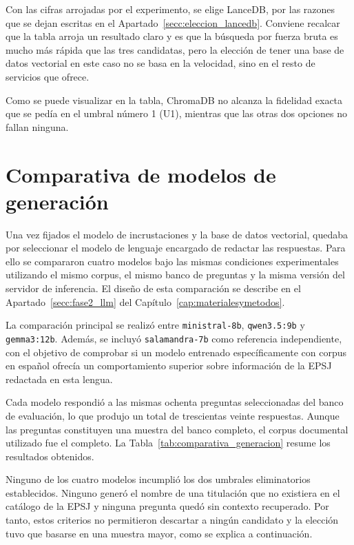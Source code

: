 Con las cifras arrojadas por el experimento, se elige LanceDB, por las razones que se dejan escritas en el Apartado~\ref{secc:eleccion_lancedb}. Conviene recalcar que la tabla arroja un resultado claro y es que la búsqueda por fuerza bruta es mucho más rápida que las tres candidatas, pero la elección de tener una base de datos vectorial en este caso no se basa en la velocidad, sino en el resto de servicios que ofrece.

Como se puede visualizar en la tabla, ChromaDB no alcanza la fidelidad exacta que se pedía en el umbral número 1 (U1), mientras que las otras dos opciones no fallan ninguna.


\section[Comparativa de modelos de generación]{Comparativa de modelos de generación}
\label{secc:resultados_rag}

Una vez fijados el modelo de incrustaciones y la base de datos vectorial, quedaba por seleccionar el modelo de lenguaje encargado de redactar las respuestas. Para ello se compararon cuatro modelos bajo las mismas condiciones experimentales utilizando el mismo corpus, el mismo banco de preguntas y la misma versión del servidor de inferencia. El diseño de esta comparación se describe en el Apartado~\ref{secc:fase2_llm} del Capítulo~\ref{cap:materialesymetodos}.

La comparación principal se realizó entre \texttt{ministral-8b}, \texttt{qwen3.5:9b} y \texttt{gemma3:12b}. Además, se incluyó \texttt{salamandra-7b} como referencia independiente, con el objetivo de comprobar si un modelo entrenado específicamente con corpus en español ofrecía un comportamiento superior sobre información de la EPSJ redactada en esta lengua.

Cada modelo respondió a las mismas ochenta preguntas seleccionadas del banco de evaluación, lo que produjo un total de trescientas veinte respuestas. Aunque las preguntas constituyen una muestra del banco completo, el corpus documental utilizado fue el completo. La Tabla~\ref{tab:comparativa_generacion} resume los resultados obtenidos.



Ninguno de los cuatro modelos incumplió los dos umbrales eliminatorios establecidos. Ninguno generó el nombre de una titulación que no existiera en el catálogo de la EPSJ y ninguna pregunta quedó sin contexto recuperado. Por tanto, estos criterios no permitieron descartar a ningún candidato y la elección tuvo que basarse en una muestra mayor, como se explica a continuación.


